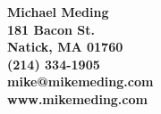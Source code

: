 \documentclass[11pt]{letter} %
\begin{document}



\begin{center}
\large\bf Michael Meding \\ %
181 Bacon St. \\ Natick, MA 01760 \\ (214) 334-1905 \\ mike@mikemeding.com \\ www.mikemeding.com
\end{center} 

\signature{Michael Meding} %


%
%
%
\end{document}
